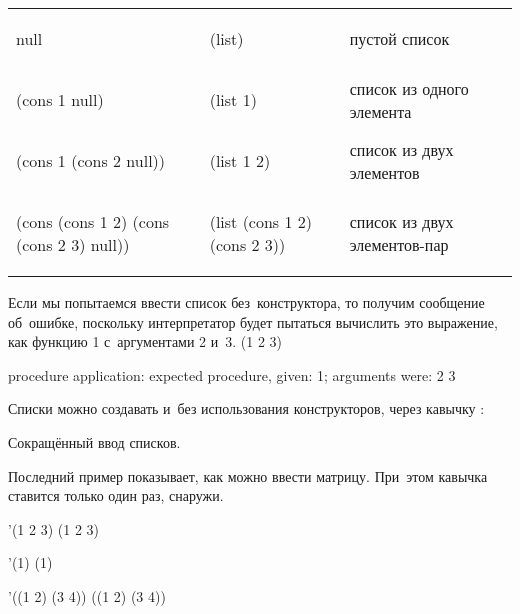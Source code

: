 \smallskip
\noindent
\begin{tabular}{ll>{\comment}p{2.5cm}}
\begin{ExampleCode}
 null
\end{ExampleCode}& 
\begin{ExampleCode}
 (list)
\end{ExampleCode}& пустой список\\
\begin{ExampleCode}
 (cons 1 null)
\end{ExampleCode}&
\begin{ExampleCode}
 (list 1)
\end{ExampleCode}& список из одного элемента\\
\begin{ExampleCode}
 (cons 1 
       (cons 2 null))
\end{ExampleCode}&
\begin{ExampleCode}
 (list 1 2)
\end{ExampleCode}& список из двух элементов\\
\begin{ExampleCode}
 (cons (cons 1 2) 
       (cons (cons 2 3) 
             null))
\end{ExampleCode} &
\begin{ExampleCode}
 (list (cons 1 2) 
       (cons 2 3))
\end{ExampleCode} & список из двух элементов-пар
\end{tabular}


\begin{example}{%
Если мы попытаемся ввести список без~конструктора, то получим сообщение об~ошибке, поскольку интерпретатор будет пытаться вычислить это выражение, как функцию 1 с~аргументами 2 и~3.}
\REPLin
  {(1 2 3)}

{\errorstyle procedure application: expected procedure, given: 1; arguments were: 2 3}
\end{example}

Списки можно создавать и~без использования конструкторов, через кавычку :

\begin{example}{Сокращённый ввод списков.

Последний пример показывает, как можно ввести матрицу. При~этом кавычка ставится только один раз, снаружи.}
\REPL
  {'(1 2 3)}
  {(1 2 3)}

\REPL
  {'(1)}
  {(1)}

\REPL
  {'((1 2) (3 4))}
  {((1 2) (3 4))}
\end{example}

